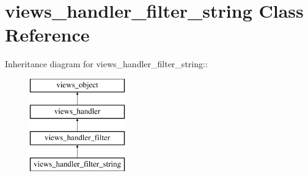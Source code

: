 \hypertarget{classviews__handler__filter__string}{
\section{views\_\-handler\_\-filter\_\-string Class Reference}
\label{classviews__handler__filter__string}
}
Inheritance diagram for views\_\-handler\_\-filter\_\-string::\begin{figure}[H]
\begin{center}
\leavevmode
\includegraphics[height=4cm]{classviews__handler__filter__string}
\end{center}
\end{figure}
